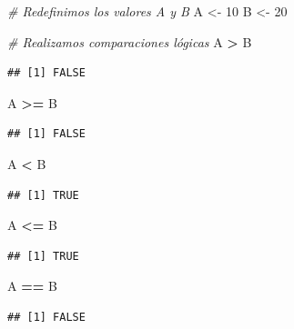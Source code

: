 \documentclass[]{book}
\newenvironment{Shaded}{\begin{snugshade}}{\end{snugshade}}
\newcommand{\CommentTok}[1]{\textcolor[rgb]{0.56,0.35,0.01}{\textit{#1}}}
\newcommand{\DecValTok}[1]{\textcolor[rgb]{0.00,0.00,0.81}{#1}}
\newcommand{\NormalTok}[1]{#1}
\newcommand{\OperatorTok}[1]{\textcolor[rgb]{0.81,0.36,0.00}{\textbf{#1}}}
\newcommand{\StringTok}[1]{\textcolor[rgb]{0.31,0.60,0.02}{#1}}
\begin{document}
\begin{Shaded}
\begin{Highlighting}[]
\CommentTok{# Redefinimos los valores A y B}
\NormalTok{A <-}\StringTok{ }\DecValTok{10}
\NormalTok{B <-}\StringTok{ }\DecValTok{20}

\CommentTok{# Realizamos comparaciones lógicas}
\NormalTok{A }\OperatorTok{>}\StringTok{  }\NormalTok{B}
\end{Highlighting}
\end{Shaded}

\begin{verbatim}
## [1] FALSE
\end{verbatim}

\begin{Shaded}
\begin{Highlighting}[]
\NormalTok{A }\OperatorTok{>=}\StringTok{ }\NormalTok{B}
\end{Highlighting}
\end{Shaded}

\begin{verbatim}
## [1] FALSE
\end{verbatim}

\begin{Shaded}
\begin{Highlighting}[]
\NormalTok{A }\OperatorTok{<}\StringTok{  }\NormalTok{B}
\end{Highlighting}
\end{Shaded}

\begin{verbatim}
## [1] TRUE
\end{verbatim}

\begin{Shaded}
\begin{Highlighting}[]
\NormalTok{A }\OperatorTok{<=}\StringTok{ }\NormalTok{B}
\end{Highlighting}
\end{Shaded}

\begin{verbatim}
## [1] TRUE
\end{verbatim}

\begin{Shaded}
\begin{Highlighting}[]
\NormalTok{A }\OperatorTok{==}\StringTok{ }\NormalTok{B}
\end{Highlighting}
\end{Shaded}

\begin{verbatim}
## [1] FALSE
\end{verbatim}
\end{document}
